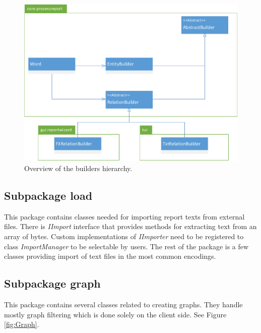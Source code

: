 \begin{figure}[!htb]
        \centering
        \includegraphics[width=\textwidth]{Images/Builders}
        \caption{Overview of the builders hierarchy.}
        \label{fig:Builders}
\end{figure}

\subsection{Subpackage load}

This package contains classes needed for importing report texts from external
files. There is \emph{IImport} interface that provides methods for extracting
text from an array of bytes. Custom implementations of \emph{IImporter} need
to be registered to class \emph{ImportManager} to be selectable by users. The
rest of the package is a few classes providing import of text files in the most
common encodings.

\subsection{Subpackage graph}

This package contains several classes related to creating graphs. They handle
mostly graph filtering which is done solely on the client side. See Figure
\ref{fig:Graph}.

